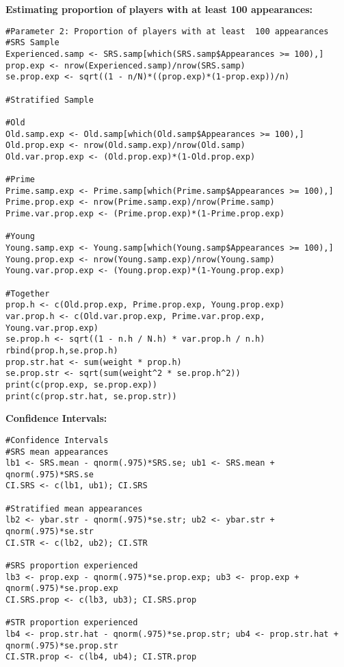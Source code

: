 \documentclass[paper=a4, fontsize=12pt,twoside]{article}	%
\begin{document}
\noindent \textbf{Estimating proportion of players with at least 100 appearances:}
\begin{lstlisting}
#Parameter 2: Proportion of players with at least  100 appearances
#SRS Sample
Experienced.samp <- SRS.samp[which(SRS.samp$Appearances >= 100),]
prop.exp <- nrow(Experienced.samp)/nrow(SRS.samp)
se.prop.exp <- sqrt((1 - n/N)*((prop.exp)*(1-prop.exp))/n)

#Stratified Sample

#Old
Old.samp.exp <- Old.samp[which(Old.samp$Appearances >= 100),]
Old.prop.exp <- nrow(Old.samp.exp)/nrow(Old.samp)
Old.var.prop.exp <- (Old.prop.exp)*(1-Old.prop.exp)

#Prime
Prime.samp.exp <- Prime.samp[which(Prime.samp$Appearances >= 100),]
Prime.prop.exp <- nrow(Prime.samp.exp)/nrow(Prime.samp)
Prime.var.prop.exp <- (Prime.prop.exp)*(1-Prime.prop.exp)

#Young
Young.samp.exp <- Young.samp[which(Young.samp$Appearances >= 100),]
Young.prop.exp <- nrow(Young.samp.exp)/nrow(Young.samp)
Young.var.prop.exp <- (Young.prop.exp)*(1-Young.prop.exp)

#Together
prop.h <- c(Old.prop.exp, Prime.prop.exp, Young.prop.exp)
var.prop.h <- c(Old.var.prop.exp, Prime.var.prop.exp, Young.var.prop.exp)
se.prop.h <- sqrt((1 - n.h / N.h) * var.prop.h / n.h)
rbind(prop.h,se.prop.h)
prop.str.hat <- sum(weight * prop.h)
se.prop.str <- sqrt(sum(weight^2 * se.prop.h^2))
print(c(prop.exp, se.prop.exp))
print(c(prop.str.hat, se.prop.str))
\end{lstlisting}

\noindent \textbf{Confidence Intervals:}
\begin{lstlisting}
#Confidence Intervals
#SRS mean appearances
lb1 <- SRS.mean - qnorm(.975)*SRS.se; ub1 <- SRS.mean + qnorm(.975)*SRS.se
CI.SRS <- c(lb1, ub1); CI.SRS

#Stratified mean appearances
lb2 <- ybar.str - qnorm(.975)*se.str; ub2 <- ybar.str + qnorm(.975)*se.str
CI.STR <- c(lb2, ub2); CI.STR

#SRS proportion experienced
lb3 <- prop.exp - qnorm(.975)*se.prop.exp; ub3 <- prop.exp + qnorm(.975)*se.prop.exp
CI.SRS.prop <- c(lb3, ub3); CI.SRS.prop

#STR proportion experienced
lb4 <- prop.str.hat - qnorm(.975)*se.prop.str; ub4 <- prop.str.hat + qnorm(.975)*se.prop.str
CI.STR.prop <- c(lb4, ub4); CI.STR.prop
\end{lstlisting}
\end{document}
